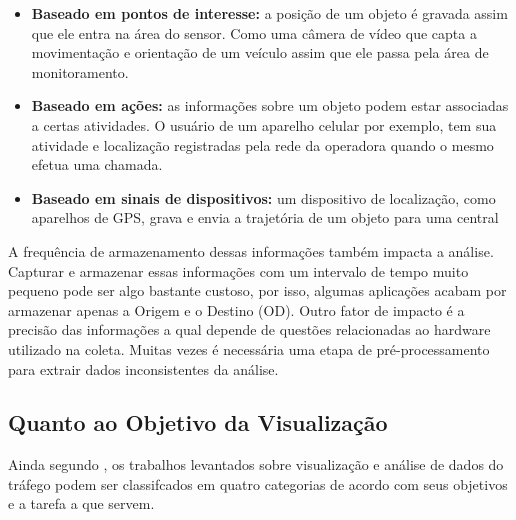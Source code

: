 \begin{itemize}
  \item \textbf{Baseado em pontos de interesse:} a posição de um objeto é
gravada assim que ele entra na área do sensor. Como uma câmera de vídeo que
capta a movimentação e orientação de um veículo assim que ele passa pela área de
monitoramento.

  \item \textbf{Baseado em ações:} as informações sobre um objeto podem estar
associadas a certas atividades. O usuário de um aparelho celular por exemplo,
tem sua atividade e localização registradas pela rede da operadora
quando o mesmo efetua uma chamada.

\item \textbf{Baseado em sinais de dispositivos:} um dispositivo de localização,
como aparelhos de GPS, grava e envia a trajetória de um objeto para uma central
\end{itemize}

A frequência de armazenamento dessas informações também impacta a análise.
Capturar e armazenar essas informações com um intervalo de tempo muito pequeno
pode ser algo bastante custoso, por isso, algumas aplicações acabam por
armazenar apenas a Origem e o Destino (OD). Outro fator de impacto é a precisão
das informações a qual depende de questões relacionadas ao hardware utilizado na
coleta. Muitas vezes é necessária uma etapa de pré-processamento para extrair
dados inconsistentes da análise.

\subsection{Quanto ao Objetivo da Visualização}

Ainda segundo \citet{Chen2015}, os trabalhos levantados sobre visualização e análise
de dados do tráfego podem ser classifcados em quatro categorias de
acordo com seus objetivos e a tarefa a que servem.

